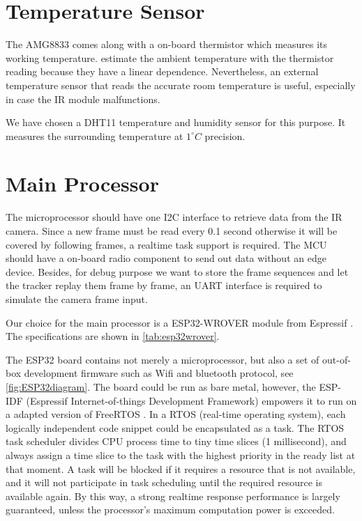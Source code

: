 \section{Temperature Sensor}
The AMG8833 comes along with a on-board thermistor which measures its working temperature. \citeauthor{trofimova2017indoor} \cite{trofimova2017indoor} estimate the ambient temperature with the thermistor reading because they have a linear dependence. Nevertheless, an external temperature sensor that reads the accurate room temperature is useful, especially in case the IR module malfunctions.

We have chosen a DHT11 temperature and humidity sensor \cite{dht11} for this purpose. It measures the surrounding temperature at $1^\circ C$ precision.
\section{Main Processor}
The microprocessor should have one I2C interface to retrieve data from the IR camera. Since a new frame must be read every 0.1 second otherwise it will be covered by following frames, a realtime task support is required. The MCU should have a on-board radio component to send out data without an edge device. Besides, for debug purpose we want to store the frame sequences and let the tracker replay them frame by frame, an UART interface is required to simulate the camera frame input.

Our choice for the main processor is a ESP32-WROVER module from Espressif \cite{esp32wroverboard}. The specifications are shown in \autoref{tab:esp32wrover}.

The ESP32 board contains not merely a microprocessor, but also a set of out-of-box development firmware such as Wifi and bluetooth protocol, see \autoref{fig:ESP32diagram}. The board could be run as bare metal, however, the ESP-IDF (Espressif Internet-of-things Development Framework) empowers it to run on a adapted version of FreeRTOS \cite{esp32freertos}. In a RTOS (real-time operating system), each logically independent code snippet could be encapsulated as a task. The RTOS task scheduler divides CPU process time to tiny time slices (1 millisecond), and always assign a time slice to the task with the highest priority in the ready list at that moment. A task will be blocked if it requires a resource that is not available, and it will not participate in task scheduling until the required resource is available again. By this way, a strong realtime response performance is largely guaranteed, unless the processor's maximum computation power is exceeded.

